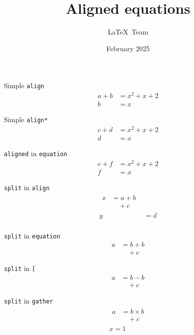 \documentclass[a4paper]{article}
\title{Aligned equations}
\author{\LaTeX\ Team}
\date{February 2025}
\begin{document}
\maketitle



Simple \texttt{align}
\begin{align}
  a+b&=x^2+x+2\\
    b&=x
\end{align}



Simple \texttt{align*}
\begin{align*}
  c+d&=x^2+x+2\\
    d&=x
\end{align*}


\texttt{aligned} in \texttt{equation}
\begin{equation}
\begin{aligned}
  e+f&=x^2+x+2\\
    f&=x
\end{aligned}
\end{equation}

\texttt{split} in \texttt{align}
\begin{align}
\begin{split}
  x&= a  +  b\\
   &\quad + c
\end{split}\\
  y&=d\\
\end{align}

\texttt{split} in \texttt{equation}
\begin{equation}
\begin{split}
 a & = b+b\\
   &\quad + c
\end{split} 
\end{equation}

\texttt{split} in \texttt{[}
\[
\begin{split}
 a & = b-b\\
   &\quad + c
\end{split} 
  \]

\texttt{split} in \texttt{gather} 
\begin{gather}
\begin{split}
 a & = b\times b\\
   &\quad + c
\end{split}\\
x=1
\end{gather}
\end{document}
